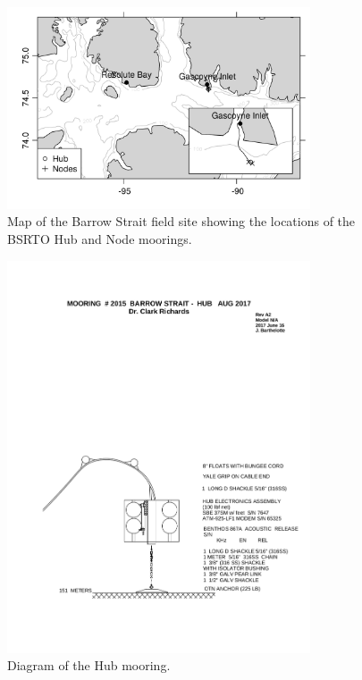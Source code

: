\documentclass[12pt]{dforeport}
\begin{document}
\pagebreak

\begin{figure}
\centering
\includegraphics[width = 0.8\textwidth]{./figures/01_BSFieldSiteOverview.png}
\caption[Map of field site]{Map of the Barrow Strait field site showing the locations of the BSRTO Hub and Node moorings.}
\label{f:map}
\end{figure}



\begin{figure}
\centering
\includegraphics[width = 0.8\textwidth]{./figures/HUB.png}
\caption[Mooring Diagram: Hub]{Diagram of the Hub mooring.}
\label{f:md_hub}
\end{figure}
\end{document}

